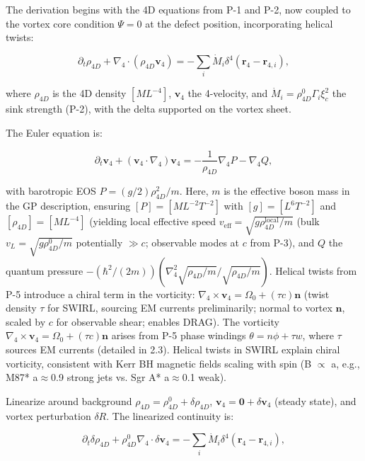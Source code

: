 The derivation begins with the 4D equations from P-1 and P-2, now coupled to the vortex core condition $\Psi=0$ at the defect position, incorporating helical twists:

\begin{equation}
\partial_t \rho_{4D} + \nabla_4 \cdot (\rho_{4D} \mathbf{v}_4) = -\sum_i \dot{M}_i \delta^4(\mathbf{r}_4 - \mathbf{r}_{4,i}),
\end{equation}

where $\rho_{4D}$ is the 4D density $[M L^{-4}]$, $\mathbf{v}_4$ the 4-velocity, and $\dot{M}_i = \rho_{4D}^0 \Gamma_i \xi_c^2$ the sink strength (P-2), with the delta supported on the vortex sheet.

The Euler equation is:

\begin{equation}
\partial_t \mathbf{v}_4 + (\mathbf{v}_4 \cdot \nabla_4) \mathbf{v}_4 = -\frac{1}{\rho_{4D}} \nabla_4 P - \nabla_4 Q,
\end{equation}

with barotropic EOS $P = (g/2) \rho_{4D}^2 / m$. Here, $m$ is the effective boson mass in the GP description, ensuring $[P] = [M L^{-2} T^{-2}]$ with $[g] = [L^6 T^{-2}]$ and $[\rho_{4D}] = [M L^{-4}]$ (yielding local effective speed $v_{\text{eff}} = \sqrt{g \rho_{4D}^{\text{local}} / m}$ (bulk $v_L = \sqrt{g \rho_{4D}^0 / m}$ potentially $\gg c$; observable modes at $c$ from P-3), and $Q$ the quantum pressure $-(\hbar^2 / (2m)) (\nabla_4^2 \sqrt{\rho_{4D}/m} / \sqrt{\rho_{4D}/m})$. Helical twists from P-5 introduce a chiral term in the vorticity: $\nabla_4 \times \mathbf{v}_4 = \Omega_0 + (\tau c) \mathbf{n}$ (twist density $\tau$ for SWIRL, sourcing EM currents preliminarily; normal to vortex $\mathbf{n}$, scaled by $c$ for observable shear; enables DRAG). The vorticity $\nabla_4 \times \mathbf{v}_4 = \Omega_0 + (\tau c) \mathbf{n}$ arises from P-5 phase windings $\theta = n\phi + \tau w$, where $\tau$ sources EM currents (detailed in 2.3). Helical twists in SWIRL explain chiral vorticity, consistent with Kerr BH magnetic fields scaling with spin (B $\propto$ a, e.g., M87* a$\approx$0.9 strong jets vs. Sgr A* a$\approx$0.1 weak).

Linearize around background $\rho_{4D} = \rho_{4D}^0 + \delta \rho_{4D}$, $\mathbf{v}_4 = \mathbf{0} + \delta \mathbf{v}_4$ (steady state), and vortex perturbation $\delta R$. The linearized continuity is:

\begin{equation}
\partial_t \delta \rho_{4D} + \rho_{4D}^0 \nabla_4 \cdot \delta \mathbf{v}_4 = -\sum_i \dot{M}_i \delta^4(\mathbf{r}_4 - \mathbf{r}_{4,i}),
\end{equation}

